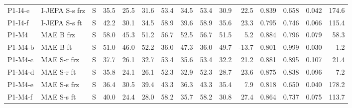 \begin{longtable}{@{}l>{\raggedright\arraybackslash}p{2.2cm}crrrrrrrrrrrr@{}}
P1-I4-e & I-JEPA S-s frz & S & 35.5 & 25.5 & 31.6 & 53.4 & 34.5 & 53.4 & 30.9 & 22.5 & 0.839 & 0.658 & 0.042 & 174.6 \\
P1-I4-f & I-JEPA S-s ft & S & 42.2 & 30.1 & 34.5 & 58.9 & 39.6 & 58.9 & 35.6 & 23.3 & 0.795 & 0.746 & 0.066 & 115.4 \\
P1-M4 & MAE B frz & S & 58.0 & 45.3 & 51.2 & 56.7 & 52.5 & 56.7 & 51.5 & 5.2 & 0.884 & 0.796 & 0.079 & 58.3 \\
P1-M4-b & MAE B ft & S & 51.0 & 46.0 & 52.2 & 36.0 & 47.3 & 36.0 & 49.7 & -13.7 & 0.801 & 0.999 & 0.030 & 1.2 \\
P1-M4-c & MAE S-r frz & S & 37.7 & 26.1 & 32.7 & 53.4 & 35.6 & 53.4 & 32.2 & 21.2 & 0.881 & 0.895 & 0.107 & 21.4 \\
P1-M4-d & MAE S-r ft & S & 35.8 & 24.1 & 26.1 & 52.3 & 32.9 & 52.3 & 28.7 & 23.6 & 0.875 & 0.838 & 0.096 & 7.2 \\
P1-M4-e & MAE S-s frz & S & 36.4 & 30.5 & 39.4 & 43.3 & 36.3 & 43.3 & 35.4 & 7.9 & 0.818 & 0.650 & 0.040 & 178.2 \\
P1-M4-f & MAE S-s ft & S & 40.0 & 24.4 & 28.0 & 58.2 & 35.7 & 58.2 & 30.8 & 27.4 & 0.864 & 0.737 & 0.075 & 113.7 \\
\end{longtable}

\endgroup

\begingroup
\scriptsize
\setlength{\tabcolsep}{2.8pt}
\renewcommand{\arraystretch}{0.98}
\setlength{\LTleft}{0pt}
\setlength{\LTright}{0pt}

